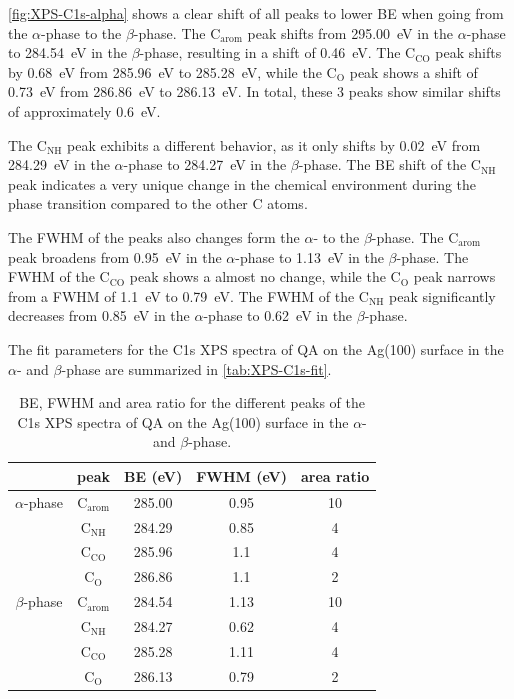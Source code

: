 \autoref{fig:XPS-C1s-alpha} shows a clear shift of all peaks to lower \ac{BE} when going from the $\alpha$-phase to the $\beta$-phase. The $\mathrm{C_{arom}}$ peak shifts from 295.00~\si{eV} in the $\alpha$-phase to 284.54~\si{eV} in the $\beta$-phase, resulting in a shift of 0.46~\si{eV}. The $\mathrm{C_{CO}}$ peak shifts by 0.68~\si{eV} from 285.96~\si{eV} to 285.28~\si{eV}, while the $\mathrm{C_{O}}$ peak shows a shift of 0.73~\si{eV} from 286.86~\si{eV} to 286.13~\si{eV}. In total, these 3 peaks show similar shifts of approximately 0.6~\si{eV}. 

The $\mathrm{C_{NH}}$ peak exhibits a different behavior, as it only shifts by 0.02~\si{eV} from 284.29~\si{eV} in the $\alpha$-phase to 284.27~\si{eV} in the $\beta$-phase. The \ac{BE} shift of the $\mathrm{C_{NH}}$ peak indicates a very unique change in the chemical environment during the phase transition compared to the other C atoms.

The \ac{FWHM} of the peaks also changes form the $\alpha$- to the $\beta$-phase. The $\mathrm{C_{arom}}$ peak broadens from 0.95~\si{eV} in the $\alpha$-phase to 1.13~\si{eV} in the $\beta$-phase. The \ac{FWHM} of the $\mathrm{C_{CO}}$ peak shows a almost no change, while the $\mathrm{C_{O}}$ peak narrows from a \ac{FWHM} of 1.1~\si{eV} to 0.79~\si{eV}. The \ac{FWHM} of the $\mathrm{C_{NH}}$ peak significantly decreases from 0.85~\si{eV} in the $\alpha$-phase to 0.62~\si{eV} in the $\beta$-phase.

The fit parameters for the C1s \ac{XPS} spectra of \ac{QA} on the Ag(100) surface in the $\alpha$- and $\beta$-phase are summarized in \autoref{tab:XPS-C1s-fit}.

\begin{table}[H]
	\centering
	\caption{\Ac{BE}, \ac{FWHM} and area ratio for the different peaks of the C1s \ac{XPS} spectra of \ac{QA} on the Ag(100) surface in the $\alpha$- and $\beta$-phase.}
	\begin{tabular}{@{}ccccc@{}} \toprule
		 & peak & \ac{BE} (eV) & \ac{FWHM} (eV) & area ratio \\
		\midrule
		$\alpha$-phase & $\mathrm{C_{arom}}$ & 285.00 & 0.95 & 10 \\
		& $\mathrm{C_{NH}}$ & 284.29 & 0.85 & 4 \\
		& $\mathrm{C_{CO}}$ & 285.96 & 1.1 & 4 \\ 
		& $\mathrm{C_{O}}$ & 286.86 & 1.1 & 2 \\
        \midrule
		$\beta$-phase & $\mathrm{C_{arom}}$ & 284.54 & 1.13 & 10 \\
		& $\mathrm{C_{NH}}$ & 284.27 & 0.62 & 4 \\
		& $\mathrm{C_{CO}}$ & 285.28 & 1.11 & 4 \\ 
		& $\mathrm{C_{O}}$ & 286.13 & 0.79 & 2 \\
		\bottomrule
	\end{tabular}
	\label{tab:XPS-C1s-fit}
\end{table}

